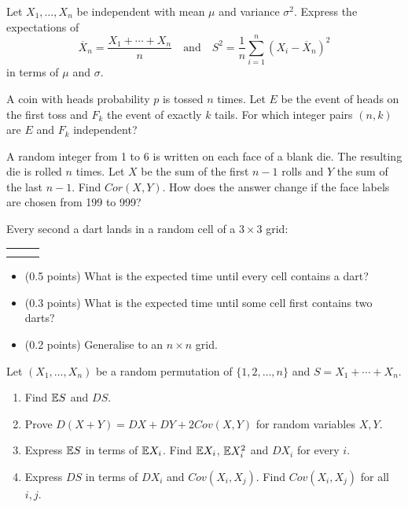 \documentclass[a4paper]{report}
\begin{document}
\begin{problempencil}[E, SE 2023]
Let $X_1,\dots,X_n$ be independent with mean $\mu$ and variance $\sigma^2$. Express the expectations of
\[\overline X_n=\frac{X_1+\cdots+X_n}{n}\quad\text{and}\quad S^2=\frac1n\sum_{i=1}^n(X_i-\overline X_n)^2\]
in terms of $\mu$ and $\sigma$.
\end{problempencil}
\begin{problempencil}[E, SE 2023]
A coin with heads probability $p$ is tossed $n$ times. Let $E$ be the event of heads on the first toss and $F_k$ the event of exactly $k$ tails. For which integer pairs $(n,k)$ are $E$ and $F_k$ independent?
\end{problempencil}
\begin{problempencil}
A random integer from 1 to 6 is written on each face of a blank die. The resulting die is rolled $n$ times. Let $X$ be the sum of the first $n-1$ rolls and $Y$ the sum of the last $n-1$. Find $Cor(X,Y)$. How does the answer change if the face labels are chosen from 199 to 999?
\end{problempencil}
\begin{problempencil}
Every second a dart lands in a random cell of a $3\times3$ grid:
\begin{center}\renewcommand{\arraystretch}{1.8}\begin{tabular}{|c|c|c|}\hline
\phantom{9}&\phantom{9}&\phantom{9}\\\hline
\phantom{9}&\phantom{9}&\phantom{9}\\\hline
\phantom{9}&\phantom{9}&\phantom{9}\\\hline
\end{tabular}\end{center}
\begin{itemize}
\item (0.5 points) What is the expected time until every cell contains a dart?
\item (0.3 points) What is the expected time until some cell first contains two darts?
\item (0.2 points) Generalise to an $n\times n$ grid.
\end{itemize}
\end{problempencil}
\begin{problempencil}
Let $(X_1,\dots,X_n)$ be a random permutation of $\{1,2,\dots,n\}$ and $S=X_1+\cdots+X_n$.
\begin{enumerate}
\item Find $\mathbb {E} S$ and $DS$.
\item Prove $D(X+Y)=DX+DY+2Cov(X,Y)$ for random variables $X,Y$.
\item Express $\mathbb {E} S$ in terms of $\mathbb {E} X_i$. Find $\mathbb {E} X_i$, $\mathbb {E} X_i^2$ and $DX_i$ for every $i$.
\item Express $DS$ in terms of $DX_i$ and $Cov(X_i,X_j)$. Find $Cov(X_i,X_j)$ for all $i,j$.
\end{enumerate}
\end{problempencil}
\end{document}
